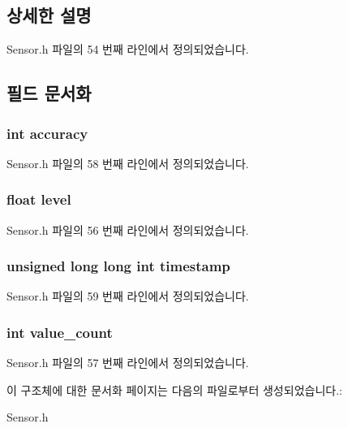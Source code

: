 \subsection{상세한 설명}


Sensor.\-h 파일의 54 번째 라인에서 정의되었습니다.



\subsection{필드 문서화}
\hypertarget{struct__Light__data_a5565cf9073275f9713f9016e7c10d25f}{
\subsubsection[{accuracy}]{\setlength{\rightskip}{0pt plus 5cm}int accuracy}}\label{struct__Light__data_a5565cf9073275f9713f9016e7c10d25f}


Sensor.\-h 파일의 58 번째 라인에서 정의되었습니다.

\hypertarget{struct__Light__data_a450c3ab9b94a4663caad892b7193b547}{
\subsubsection[{level}]{\setlength{\rightskip}{0pt plus 5cm}float level}}\label{struct__Light__data_a450c3ab9b94a4663caad892b7193b547}


Sensor.\-h 파일의 56 번째 라인에서 정의되었습니다.

\hypertarget{struct__Light__data_a8de02c4128636a7bf630ff5428f60c8d}{
\subsubsection[{timestamp}]{\setlength{\rightskip}{0pt plus 5cm}unsigned long long int timestamp}}\label{struct__Light__data_a8de02c4128636a7bf630ff5428f60c8d}


Sensor.\-h 파일의 59 번째 라인에서 정의되었습니다.

\hypertarget{struct__Light__data_a40a079bfc72408819dc78da308203a74}{
\subsubsection[{value\-\_\-count}]{\setlength{\rightskip}{0pt plus 5cm}int value\-\_\-count}}\label{struct__Light__data_a40a079bfc72408819dc78da308203a74}


Sensor.\-h 파일의 57 번째 라인에서 정의되었습니다.



이 구조체에 대한 문서화 페이지는 다음의 파일로부터 생성되었습니다.\-:\begin{DoxyCompactItemize}
\item 
Sensor.\-h\end{DoxyCompactItemize}
